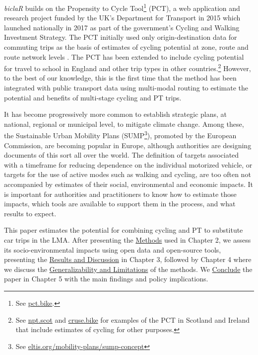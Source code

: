 \documentclass[review, doubleblind, 3p,
authoryear]{elsarticle} %
\begin{document}
\emph{biclaR} builds on the Propensity to Cycle Tool\footnote{See
  \href{https://www.pct.bike/}{pct.bike}.} (PCT), a web application and
research project funded by the UK's Department for Transport in 2015
which launched nationally in 2017 as part of the government's Cycling
and Walking Investment Strategy. The PCT initially used only
origin-destination data for commuting trips as the basis of estimates of
cycling potential at zone, route and route network levels
\citep{lovelace2017}. The PCT has been extended to include cycling
potential for travel to school in England \citep{goodman2019} and other
trip types in other countries.\footnote{See
  \href{https://www.npt.scot}{npt.scot} and
  \href{https://cruse.bike}{cruse.bike} for examples of the PCT in
  Scotland and Ireland that include estimates of cycling for other
  purposes.} However, to the best of our knowledge, this is the first
time that the method has been integrated with public transport data
using multi-modal routing to estimate the potential and benefits of
multi-stage cycling and PT trips.

It has become progressively more common to establish strategic plans, at
national, regional or municipal level, to mitigate climate change. Among
these, the Sustainable Urban Mobility Plans (SUMP\footnote{See
  \href{https://www.eltis.org/mobility-plans/sump-concept}{eltis.org/mobility-plans/sump-concept}}),
promoted by the European Commission, are becoming popular in Europe,
although authorities are designing documents of this sort all over the
world. The definition of targets associated with a timeframe for
reducing dependence on the individual motorized vehicle, or targets for
the use of active modes such as walking and cycling, are too often not
accompanied by estimates of their social, environmental and economic
impacts. It is important for authorities and practitioners to know how
to estimate those impacts, which tools are available to support them in
the process, and what results to expect.

This paper estimates the potential for combining cycling and PT to
substitute car trips in the LMA. After presenting the
\hyperref[methods]{Methods} used in Chapter 2, we assess its
socio-environmental impacts using open data and open-source tools,
presenting the \hyperref[results-and-discussion]{Results and Discussion}
in Chapter 3, followed by Chapter 4 where we discuss the
\hyperref[generalizability-and-limitations]{Generalizability and
Limitations} of the methods. We \hyperref[Conclusions]{Conclude} the
paper in Chapter 5 with the main findings and policy implications.
\end{document}
